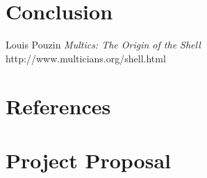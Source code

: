 \documentclass[12pt,twoside,notitlepage]{report}
\begin{document}
\cleardoublepage
\chapter{Conclusion}


\cleardoublepage


\begin{thebibliography}{1} %

  Louis Pouzin
  \emph{Multics: The Origin of the Shell}
  http://www.multicians.org/shell.html

\end{thebibliography}
\cleardoublepage

\appendix

\chapter{References}

\chapter{Project Proposal}
\parindent 0pt
\parskip 6pt

\end{document}
